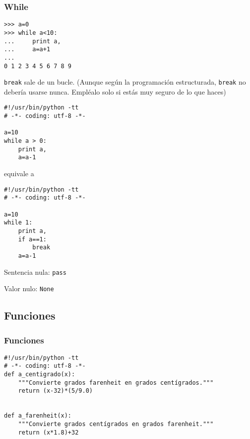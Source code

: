 \documentclass[ucs]{beamer}
\begin{document}

\begin{frame}[fragile]
 
\frametitle{While}
\begin{scriptsize}
\begin{verbatim}
>>> a=0
>>> while a<10:
...     print a,
...     a=a+1
... 
0 1 2 3 4 5 6 7 8 9
\end{verbatim}
\end{scriptsize}


\end{frame}


\begin{frame}[fragile]

  
\verb|break| sale de un bucle.
(Aunque según la programación estructurada, \verb|break| no
debería usarse nunca. Empléalo solo si estás muy seguro de lo que
haces)

\begin{scriptsize}
\begin{verbatim}
#!/usr/bin/python -tt
# -*- coding: utf-8 -*-

a=10
while a > 0:
    print a,
    a=a-1
\end{verbatim}
\end{scriptsize}

equivale a 

\begin{scriptsize}
\begin{verbatim}
#!/usr/bin/python -tt
# -*- coding: utf-8 -*-

a=10
while 1:
    print a,
    if a==1:
        break
    a=a-1
\end{verbatim}
\end{scriptsize}
 
Sentencia nula: \verb|pass|

Valor nulo: \verb|None| 

\end{frame}



\subsection{Funciones}
\begin{frame}[fragile]
\frametitle{Funciones }  

  \begin{scriptsize}
\begin{verbatim}
#!/usr/bin/python -tt
# -*- coding: utf-8 -*-
def a_centigrado(x):
    """Convierte grados farenheit en grados centígrados."""
    return (x-32)*(5/9.0)


def a_farenheit(x):
    """Convierte grados centígrados en grados farenheit."""
    return (x*1.8)+32
\end{verbatim}
  \end{scriptsize}
\end{frame}
\end{document}

